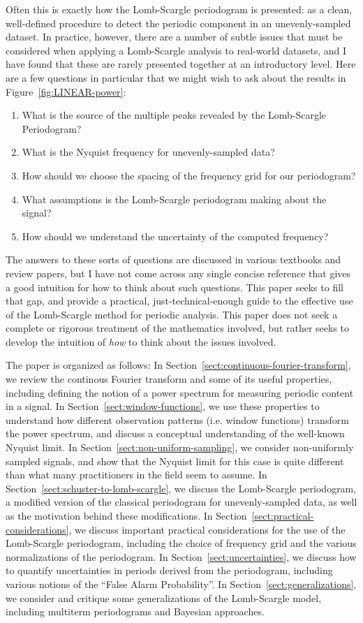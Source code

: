 \documentclass[preprint]{aastex}
\newcommand{\fig}[1]{Figure~\ref{fig:#1}}
\newcommand{\Sect}[1]{Section~\ref{sect:#1}}
\newcommand{\sect}[1]{\Sect{#1}}
\begin{document}
Often this is exactly how the Lomb-Scargle periodogram is presented: as a clean, well-defined procedure to detect the periodic component in an unevenly-sampled dataset.
In practice, however, there are a number of subtle issues that must be considered when applying a Lomb-Scargle analysis to real-world datasets, and I have found that these are rarely presented together at an introductory level.
Here are a few questions in particular that we might wish to ask about the results in \fig{LINEAR-power}:
\begin{enumerate}
  \item What is the source of the multiple peaks revealed by the Lomb-Scargle Periodogram?
  \item What is the Nyquist frequency for unevenly-sampled data?
  \item How should we choose the spacing of the frequency grid for our periodogram?
  \item What assumptions is the Lomb-Scargle periodogram making about the signal?
  \item How should we understand the uncertainty of the computed frequency?
\end{enumerate}
The answers to these sorts of questions are discussed in various textbooks and review papers, but I have not come across any single concise reference that gives a good intuition for how to think about such questions.
This paper seeks to fill that gap, and provide a practical, just-technical-enough guide to the effective use of the Lomb-Scargle method for periodic analysis.
This paper does not seek a complete or rigorous treatment of the mathematics involved, but rather seeks to develop the intuition of {\it how} to think about the issues involved.

The paper is organized as follows:
In \sect{continuous-fourier-transform}, we review the continous Fourier
transform and some of its useful properties, including defining the notion of
a power spectrum for measuring periodic content in a signal.
In \sect{window-functions}, we use these properties to understand how different
observation patterns (i.e. window functions) transform the power spectrum, and
discuss a conceptual understanding of the well-known Nyquist limit.
In \sect{non-uniform-sampling}, we consider non-uniformly sampled signals, and
show that the Nyquist limit for this case is quite different than what many
practitioners in the field seem to assume.
In \sect{schuster-to-lomb-scargle}, we discuss the Lomb-Scargle periodogram, a
modified version of the classical periodogram for unevenly-sampled data, as
well as the motivation behind these modifications.
In \sect{practical-considerations}, we discuss important practical
considerations for the use of the Lomb-Scargle periodogram, including
the choice of frequency grid and the various normalizations of the periodogram.
In \sect{uncertainties}, we discuss how to quantify uncertainties in periods
derived from the periodogram, including various notions of the
``False Alarm Probability''.
In \sect{generalizations}, we consider and critique some generalizations of
the Lomb-Scargle model, including multiterm periodograms and Bayesian
approaches.
\end{document}
